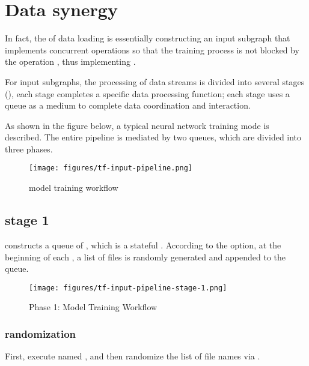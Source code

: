 \section{Data synergy}

\begin{content}

In fact, the  of data loading is essentially constructing an input subgraph that implements concurrent  operations so that the training process is not blocked by the operation , thus implementing .

For input subgraphs, the processing of data streams is divided into several stages (), each stage completes a specific data processing function; each stage uses a queue as a medium to complete data coordination and interaction.

As shown in the figure below, a typical neural network training mode is described. The entire pipeline is mediated by two queues, which are divided into three phases.

\begin{figure}[!htbp]
\centering
\texttt{[image: figures/tf-input-pipeline.png]}
\caption{model training workflow}
 \label{fig:tf-input-pipeline}
\end{figure}

\subsection{stage 1}

 constructs a queue of , which is a stateful . According to the  option, at the beginning of each , a list of files is randomly generated and appended to the queue.

\begin{figure}[!htbp]
\centering
\texttt{[image: figures/tf-input-pipeline-stage-1.png]}
\caption{Phase 1: Model Training Workflow}
 \label{fig:tf-input-pipeline-stage-1}
\end{figure}

\subsubsection{randomization}

First, execute  named , and then randomize the list of file names via .


\end{content}
